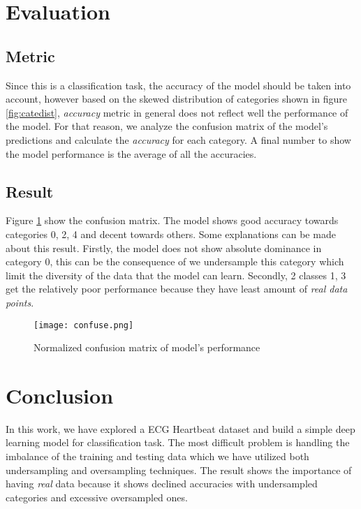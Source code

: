 \documentclass[conference]{IEEEtran}
\begin{document}
\section{Evaluation}
\subsection{Metric}
Since this is a classification task, the accuracy of the model should be taken into account, however based on the skewed distribution of categories shown in figure \ref{fig:catedist}, \emph{accuracy} metric in general does not reflect well the performance of the model. For that reason, we analyze the confusion matrix of the model's predictions and calculate the \emph{accuracy} for each category. A final number to show the model performance is the average of all the accuracies.

\subsection{Result}
Figure \ref{fig:confuse} show the confusion matrix. The model shows good accuracy towards categories 0, 2, 4 and decent towards others. Some explanations can be made about this result. Firstly, the model does not show absolute dominance in category 0, this can be the consequence of we undersample this category which limit the diversity of the data that the model can learn. Secondly, 2 classes 1, 3 get the relatively poor performance because they have least amount of \emph{real data points}.
\begin{figure}[h]
    \texttt{[image: confuse.png]}
    \caption{Normalized confusion matrix of model's performance}
    \label{fig:confuse}
\end{figure}

\section{Conclusion}
In this work, we have explored a ECG Heartbeat dataset and build a simple deep learning model for classification task. The most difficult problem is handling the imbalance of the training and testing data which we have utilized both undersampling and oversampling techniques. The result shows the importance of having \emph{real} data because it shows declined accuracies with undersampled categories and excessive oversampled ones.

\printbibliography
\end{document}
